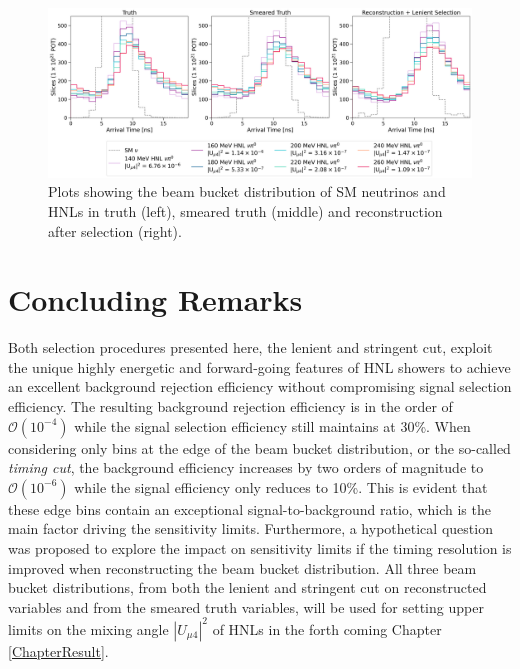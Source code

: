 \begin{figure}[ht!]
    \centering
    \includegraphics[width=\textwidth]{truth_smear_zoom.png}
    \caption{Plots showing the beam bucket distribution of SM neutrinos and HNLs in truth (left), smeared truth (middle) and reconstruction after selection (right).}
    \label{fig:hnl_sm_smear}
\end{figure}


\section{Concluding Remarks}
\label{sec:select_conclude}

Both selection procedures presented here, the lenient and stringent cut, exploit the unique highly energetic and forward-going features of HNL showers to achieve an excellent background rejection efficiency without compromising signal selection efficiency.
The resulting background rejection efficiency is in the order of $\mathcal{O}(10^{-4})$ while the signal selection efficiency still maintains at 30\%. 
When considering only bins at the edge of the beam bucket distribution, or the so-called \textit{timing cut}, the background efficiency increases by two orders of magnitude to $\mathcal{O}(10^{-6})$ while the signal efficiency only reduces to 10\%. 
This is evident that these edge bins contain an exceptional signal-to-background ratio, which is the main factor driving the sensitivity limits.
Furthermore, a hypothetical question was proposed to explore the impact on sensitivity limits if the timing resolution is improved when reconstructing the beam bucket distribution.
All three beam bucket distributions, from both the lenient and stringent cut on reconstructed variables and from the smeared truth variables, will be used for setting upper limits on the mixing angle $|U_{\mu4}|^2$ of HNLs in the forth coming Chapter \ref{ChapterResult}. 


